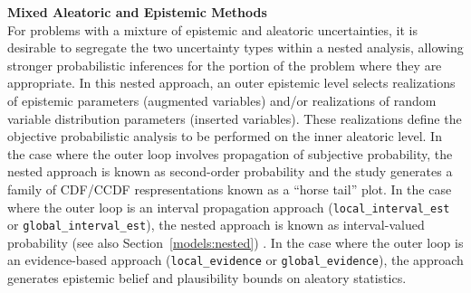{\bf Mixed Aleatoric and Epistemic Methods} \\
For problems with a mixture of epistemic and aleatoric uncertainties,
it is desirable to segregate the two uncertainty types within a nested
analysis, allowing stronger probabilistic inferences for the portion
of the problem where they are appropriate. In this nested approach, an
outer epistemic level selects realizations of epistemic parameters
(augmented variables) and/or realizations of random variable
distribution parameters (inserted variables). These realizations
define the objective probabilistic analysis to be performed on the
inner aleatoric level. In the case where the outer loop involves
propagation of subjective probability, the nested approach is known as
second-order probability and the study generates a family of CDF/CCDF
respresentations known as a ``horse tail'' plot.  In the case where
the outer loop is an interval propagation approach
(\texttt{local\_interval\_est} or \texttt{global\_interval\_est}), the
nested approach is known as interval-valued probability (see also
Section~\ref{models:nested}) . In the case where the outer loop is an
evidence-based approach (\texttt{local\_evidence} or
\texttt{global\_evidence}), the approach generates epistemic belief
and plausibility bounds on aleatory statistics.

